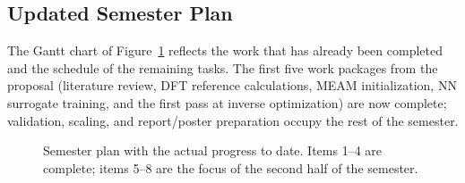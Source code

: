 \subsection{Updated Semester Plan}

The Gantt chart of Figure~\ref{fig:gantt} reflects the work that has
already been completed and the schedule of the remaining tasks. The first
five work packages from the proposal (literature review, DFT reference
calculations, MEAM initialization, NN surrogate training, and the first
pass at inverse optimization) are now complete; validation, scaling, and
report/poster preparation occupy the rest of the semester.

\begin{figure}[h]
	\centering
	\begin{semestergantt}
	\end{semestergantt}
	\caption{Semester plan with the actual progress to date. Items 1--4
	are complete; items 5--8 are the focus of the second half of the
	semester.}
	\label{fig:gantt}
\end{figure}

